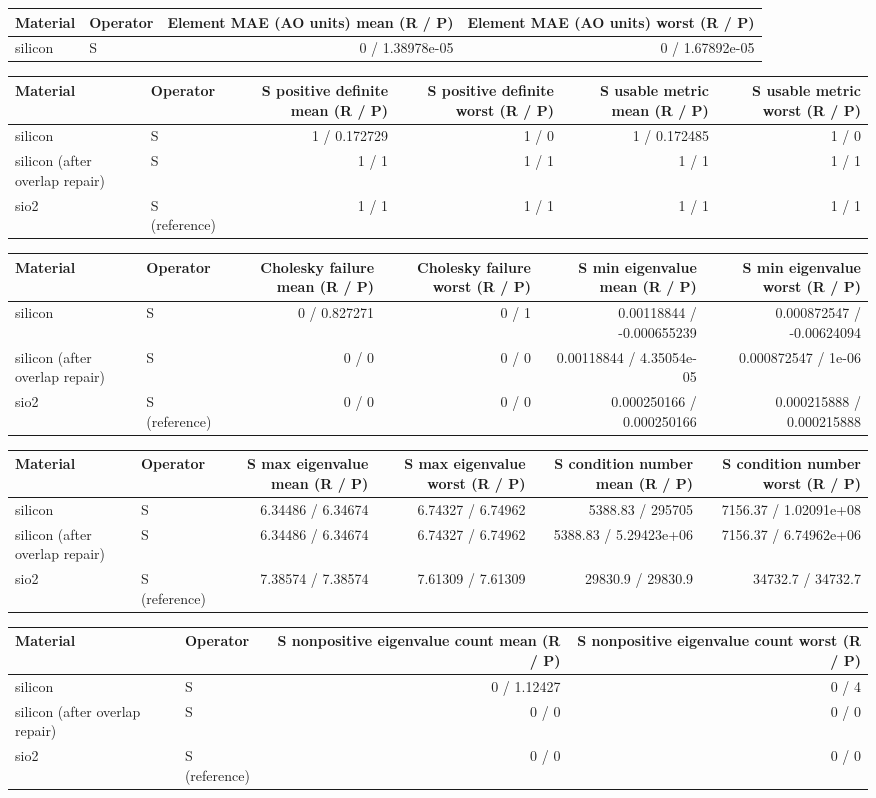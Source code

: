 \begin{tabular}{llrr}
\toprule
Material & Operator & Element MAE (AO units) mean (R / P) & Element MAE (AO units) worst (R / P) \\
\midrule
silicon & S & 0 / 1.38978e-05 & 0 / 1.67892e-05 \\
\bottomrule
\end{tabular}
\begin{tabular}{llrrrr}
\toprule
Material & Operator & S positive definite mean (R / P) & S positive definite worst (R / P) & S usable metric mean (R / P) & S usable metric worst (R / P) \\
\midrule
silicon & S & 1 / 0.172729 & 1 / 0 & 1 / 0.172485 & 1 / 0 \\
silicon (after overlap repair) & S & 1 / 1 & 1 / 1 & 1 / 1 & 1 / 1 \\
sio2 & S (reference) & 1 / 1 & 1 / 1 & 1 / 1 & 1 / 1 \\
\bottomrule
\end{tabular}
\begin{tabular}{llrrrr}
\toprule
Material & Operator & Cholesky failure mean (R / P) & Cholesky failure worst (R / P) & S min eigenvalue mean (R / P) & S min eigenvalue worst (R / P) \\
\midrule
silicon & S & 0 / 0.827271 & 0 / 1 & 0.00118844 / -0.000655239 & 0.000872547 / -0.00624094 \\
silicon (after overlap repair) & S & 0 / 0 & 0 / 0 & 0.00118844 / 4.35054e-05 & 0.000872547 / 1e-06 \\
sio2 & S (reference) & 0 / 0 & 0 / 0 & 0.000250166 / 0.000250166 & 0.000215888 / 0.000215888 \\
\bottomrule
\end{tabular}
\begin{tabular}{llrrrr}
\toprule
Material & Operator & S max eigenvalue mean (R / P) & S max eigenvalue worst (R / P) & S condition number mean (R / P) & S condition number worst (R / P) \\
\midrule
silicon & S & 6.34486 / 6.34674 & 6.74327 / 6.74962 & 5388.83 / 295705 & 7156.37 / 1.02091e+08 \\
silicon (after overlap repair) & S & 6.34486 / 6.34674 & 6.74327 / 6.74962 & 5388.83 / 5.29423e+06 & 7156.37 / 6.74962e+06 \\
sio2 & S (reference) & 7.38574 / 7.38574 & 7.61309 / 7.61309 & 29830.9 / 29830.9 & 34732.7 / 34732.7 \\
\bottomrule
\end{tabular}
\begin{tabular}{llrr}
\toprule
Material & Operator & S nonpositive eigenvalue count mean (R / P) & S nonpositive eigenvalue count worst (R / P) \\
\midrule
silicon & S & 0 / 1.12427 & 0 / 4 \\
silicon (after overlap repair) & S & 0 / 0 & 0 / 0 \\
sio2 & S (reference) & 0 / 0 & 0 / 0 \\
\bottomrule
\end{tabular}
